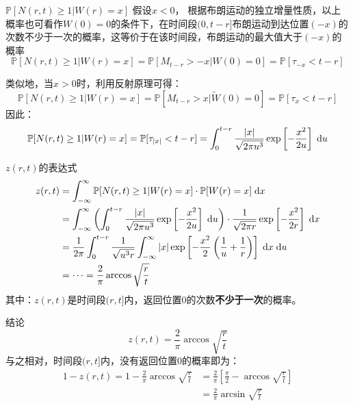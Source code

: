 \documentclass[t]{beamer}
\newcommand{\dif}{{\;\rm d}}
\renewcommand{\Pr}{\mathbb{P}}
\begin{document}
\begin{frame}{$\Pr[N(r,t)\ge 1|W(r)=x]$}
  假设$x<0$，
根据布朗运动的独立增量性质，以上概率也可看作$W(0)=0$的条件下，在时间段$(0,t-r]$布朗运动到达位置$(-x)$的次数不少于一次的概率，这等价于在该时间段，布朗运动的最大值大于$(-x)$的概率
\[\Pr[N(r,t)\ge 1|W(r)=x]=\Pr[M_{t-r}>-x|W(0)=0]=\Pr[\tau_{-x}< t-r]\]

类似地，当$x>0$时，利用反射原理可得：
\begin{equation*}
\Pr[N(r,t)\ge 1|W(r)=x]=\Pr[M_{t-r}>x|\widetilde W(0)=0]=\Pr[\tau_{x}< t-r]
\end{equation*}
因此：
\begin{equation*}
\Pr[N(r,t)\ge 1|W(r)=x]=\Pr[\tau_{|x|}< t-r]=\int^{t-r}_0\frac{|x|}{\sqrt{2\pi u^3}}\exp\left[-\frac{x^2}{2u}\right]\dif u
\end{equation*}
\end{frame}

\begin{frame}{$z(r,t)$的表达式}
\begin{equation*}
\begin{split}
z(r,t)&=\int_{-\infty}^{\infty}\Pr[N(r,t)\ge 1|W(r)=x]\cdot \Pr[W(r)=x]\dif x\\
&=\int_{-\infty}^{\infty} \left( \int^{t-r}_0\frac{|x|}{\sqrt{2\pi u^3}}\exp\left[-\frac{x^2}{2u}\right]\dif u \right) \cdot \frac{1}{\sqrt{2\pi  r}}\exp\left[-\frac{x^2}{2r}\right]\dif x\\
&=\frac{1}{2\pi} \int^{t-r}_0 \frac{1}{\sqrt{u^3r}}   \int_{-\infty}^{\infty} |x|\exp\left[-\frac{x^2}{2}\left(\frac{1}{u}+\frac{1}{r} \right) \right] \dif x\dif u\\
&= \cdots =\frac{2}{\pi}\arccos \sqrt{\frac{r}{t}}
\end{split}
\end{equation*}
其中：$z(r,t)$是时间段$(r,t]$内，返回位置0的次数\textbf{不少于一次}的概率。
\end{frame}

\begin{frame}{结论}
\begin{equation*}
z(r,t)=\frac{2}{\pi}\arccos \sqrt{\frac{r}{t}}
\end{equation*}
与之相对，时间段$(r,t]$内，没有返回位置0的概率即为：
\begin{equation*}
\begin{split}
1-z(r,t)=1-\frac{2}{\pi}\arccos \sqrt{\frac{r}{t}}
&=\frac{2}{\pi}\left[\frac{\pi}{2}-\arccos \sqrt{\frac{r}{t}}\right]\\
&=\frac{2}{\pi} \arcsin \sqrt{\frac{r}{t}} \\
\end{split}
\end{equation*}
\end{frame}
\end{document}

